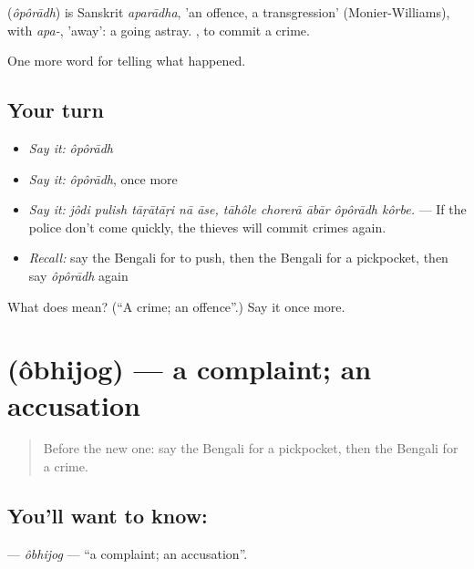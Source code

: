 \begin{cousinweb}
\textbf{} (\emph{ôpôrādh}) is Sanskrit \emph{aparādha}, 'an offence, a transgression' (Monier-Williams), with \emph{apa-}, 'away': a going astray.  , to commit a crime.
\end{cousinweb}

\begin{grammarlens}[title={What you've built}]
One more word for telling what happened.
\end{grammarlens}

\subsection*{Your turn}
\begin{itemize}
\raggedright
  \item \emph{Say it:} \emph{ôpôrādh}
  \item \emph{Say it:} \emph{ôpôrādh}, once more
  \item \emph{Say it:} \emph{jôdi pulish tāṛātāṛi nā āse, tāhôle chorerā ābār ôpôrādh kôrbe.} — If the police don't come quickly, the thieves will commit crimes again.
  \item \emph{Recall:} say the Bengali for to push, then the Bengali for a pickpocket, then say \emph{ôpôrādh} again
\end{itemize}

\begin{tcolorbox}[breakable,colback=teal!4,colframe=teal!35!black,title={Before you move on}]
What does  mean? (\textquotedblleft{}A crime; an offence\textquotedblright{}.) Say it once more.
\end{tcolorbox}
\section[\texorpdfstring{\bn{অভিযোগ} (ôbhijog)}{অভিযোগ (ôbhijog)}]{ (ôbhijog) — a complaint; an accusation}

\label{lesson:BN-C283-obhijog}



\begin{quote}
Before the new one: say the Bengali for a pickpocket, then the Bengali for a crime.
\end{quote}

\subsection*{You'll want to know: }
\textbf{} — \emph{ôbhijog} — \textquotedblleft{}a complaint; an accusation\textquotedblright{}.


